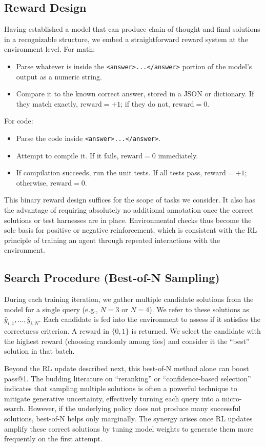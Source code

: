 \documentclass{article}
\begin{document}
\subsection{Reward Design}
Having established a model that can produce chain-of-thought and final solutions in a recognizable structure, we embed a straightforward reward system at the environment level. For math:
\begin{itemize}
\item Parse whatever is inside the \texttt{<answer>...</answer>} portion of the model’s output as a numeric string.
\item Compare it to the known correct answer, stored in a JSON or dictionary. If they match exactly, $\text{reward} = +1$; if they do not, $\text{reward} = 0$.
\end{itemize}

For code:
\begin{itemize}
\item Parse the code inside \texttt{<answer>...</answer>}.
\item Attempt to compile it. If it fails, $\text{reward} = 0$ immediately.
\item If compilation succeeds, run the unit tests. If all tests pass, $\text{reward} = +1$; otherwise, $\text{reward} = 0$.
\end{itemize}

This binary reward design suffices for the scope of tasks we consider. It also has the advantage of requiring absolutely no additional annotation once the correct solutions or test harnesses are in place. Environmental checks thus become the sole basis for positive or negative reinforcement, which is consistent with the RL principle of training an agent through repeated interactions with the environment.

\subsection{Search Procedure (Best-of-N Sampling)}
During each training iteration, we gather multiple candidate solutions from the model for a single query (e.g., $N=3$ or $N=4$). We refer to these solutions as $\hat{y}_{i,1}, \dots, \hat{y}_{i,N}$. Each candidate is fed into the environment to assess if it satisfies the correctness criterion. A reward in $\{0, 1\}$ is returned. We select the candidate with the highest reward (choosing randomly among ties) and consider it the “best” solution in that batch.

Beyond the RL update described next, this best-of-N method alone can boost pass@1. The budding literature on “reranking” or “confidence-based selection” indicates that sampling multiple solutions is often a powerful technique to mitigate generative uncertainty, effectively turning each query into a micro-search. However, if the underlying policy does not produce many successful solutions, best-of-N helps only marginally. The synergy arises once RL updates amplify these correct solutions by tuning model weights to generate them more frequently on the first attempt.
\end{document}
